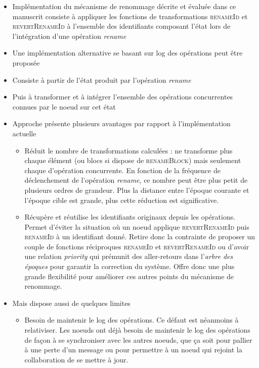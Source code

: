 \documentclass[12pt]{thesul}
\begin{document}
\begin{itemize}
  \item Implémentation du mécanisme de renommage décrite et évaluée dans ce manuscrit consiste à appliquer les fonctions de transformations \textsc{renameId} et \textsc{revertRenameId} à l'ensemble des identifiants composant l'état lors de l'intégration d'une opération \emph{rename}
  \item Une implémentation alternative se basant sur log des opérations peut être proposée
  \item Consiste à partir de l'état produit par l'opération \emph{rename}
  \item Puis à transformer et à intégrer l'ensemble des opérations concurrentes connues par le noeud sur cet état
  \item Approche présente plusieurs avantages par rapport à l'implémentation actuelle
  \begin{itemize}
    \item Réduit le nombre de transformations calculées : ne transforme plus chaque élément (ou blocs si dispose de \textsc{renameBlock}) mais seulement chaque d'opération concurrente.
      En fonction de la fréquence de déclenchement de l'opération \emph{rename}, ce nombre peut être plus petit de plusieurs ordres de grandeur.
      Plus la distance entre l'époque courante et l'époque cible est grande, plus cette réduction est significative.
    \item Récupère et réutilise les identifiants originaux depuis les opérations.
      Permet d'éviter la situation où un noeud applique \textsc{revertRenameId} puis \textsc{renameId} à un identifiant donné.
      Retire donc la contrainte de proposer un couple de fonctions réciproques \textsc{renameId} et \textsc{revertRenameId} ou d'avoir une relation \emph{priority} qui prémunit des aller-retours dans l'\emph{arbre des époques} pour garantir la correction du système.
      Offre donc une plus grande flexibilité pour améliorer ces autres points du mécanisme de renommage.
  \end{itemize}
  \item Mais dispose aussi de quelques limites
  \begin{itemize}
    \item Besoin de maintenir le log des opérations.
      Ce défaut est néanmoins à relativiser.
      Les noeuds ont déjà besoin de maintenir le log des opérations de façon à se synchroniser avec les autres noeuds, que ça soit pour pallier à une perte d'un message ou pour permettre à un noeud qui rejoint la collaboration de se mettre à jour.

\end{itemize}
\end{itemize}
\end{document}
